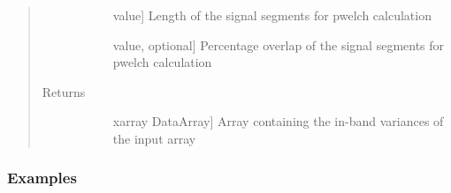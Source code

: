 \documentclass[letterpaper,10pt,english]{sphinxmanual}
\begin{document}
\begin{fulllineitems}
\begin{quote}
\begin{description}
\begin{description}
\begin{itemize}
\end{itemize}

\item[{\sphinxstylestrong{nwindow}}] \leavevmode{[}value{]}
Length of the signal segments for pwelch calculation

\item[{\sphinxstylestrong{overlap}}] \leavevmode{[}value, optional{]}
Percentage overlap of the signal segments for pwelch calculation

\end{description}

\item[{Returns}] \leavevmode\begin{description}
\item[{}] \leavevmode{[}xarray DataArray{]}
Array containing the in-band variances of the input array

\end{description}

\end{description}\end{quote}
\subsubsection*{Examples}


\end{fulllineitems}
\end{document}
